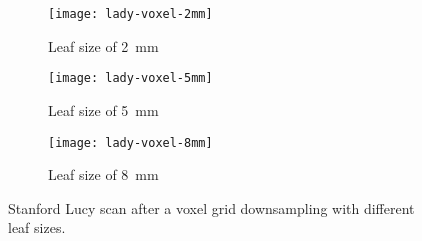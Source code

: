 \begin{figure}[h]
    
    \centering
    \begin{subfigure}[t]{0.3\textwidth}
        \centering
        \texttt{[image: lady-voxel-2mm]}
        \caption{Leaf size of \SI{2}{\milli\meter}}
        \label{figure:lucy-voxel-grid-2mm}
    \end{subfigure}%
    \begin{subfigure}[t]{0.3\textwidth}
        \centering
        \texttt{[image: lady-voxel-5mm]}
        \caption{Leaf size of \SI{5}{\milli\meter}}
        \label{figure:lucy-voxel-grid-5mm}
    \end{subfigure}%
    \begin{subfigure}[t]{0.3\textwidth}
        \centering
        \texttt{[image: lady-voxel-8mm]}
        \caption{Leaf size of \SI{8}{\milli\meter}}
        \label{figure:lucy-voxel-grid-8mm}
    \end{subfigure}

    \caption{Stanford Lucy scan \cite{stanford-scanning-rep} after a voxel grid downsampling with different leaf sizes.}
    \label{figure:lucy-voxel-grid}
\end{figure}